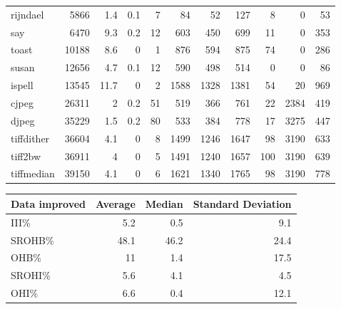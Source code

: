 \begin{tabular}{lrrrrrrrrrr}
 rijndael        &           5866 &      1.4 &    0.1 &    7 &     84 &         52 &          127 &     8 &     0 &    53 \\
 say             &           6470 &      9.3 &    0.2 &   12 &    603 &        450 &          699 &    11 &     0 &   353 \\
 toast           &          10188 &      8.6 &    0   &    1 &    876 &        594 &          875 &    74 &     0 &   286 \\
 susan           &          12656 &      4.7 &    0.1 &   12 &    590 &        498 &          514 &     0 &     0 &    86 \\
 ispell          &          13545 &     11.7 &    0   &    2 &   1588 &       1328 &         1381 &    54 &    20 &   969 \\
 cjpeg           &          26311 &      2   &    0.2 &   51 &    519 &        366 &          761 &    22 &  2384 &   419 \\
 djpeg           &          35229 &      1.5 &    0.2 &   80 &    533 &        384 &          778 &    17 &  3275 &   447 \\
 tiffdither      &          36604 &      4.1 &    0   &    8 &   1499 &       1246 &         1647 &    98 &  3190 &   633 \\
 tiff2bw         &          36911 &      4   &    0   &    5 &   1491 &       1240 &         1657 &   100 &  3190 &   639 \\
 tiffmedian      &          39150 &      4.1 &    0   &    6 &   1621 &       1340 &         1765 &    98 &  3190 &   778 \\
\hline
\end{tabular}\begin{tabular}{lrrr}
\hline
 Data improved   &   Average &   Median &   Standard Deviation \\
\hline
 III\%            &       5.2 &      0.5 &                  9.1 \\
 SROHB\%          &      48.1 &     46.2 &                 24.4 \\
 OHB\%            &      11   &      1.4 &                 17.5 \\
 SROHI\%          &       5.6 &      4.1 &                  4.5 \\
 OHI\%            &       6.6 &      0.4 &                 12.1 \\
\hline
\end{tabular}